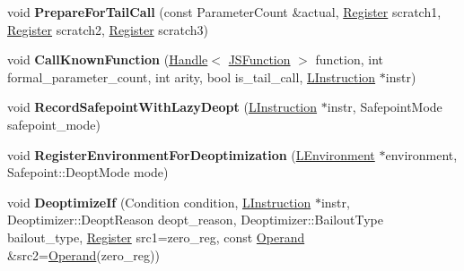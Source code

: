\begin{DoxyCompactItemize}
\item 
void {\bfseries Prepare\+For\+Tail\+Call} (const Parameter\+Count \&actual, \hyperlink{structv8_1_1internal_1_1_register}{Register} scratch1, \hyperlink{structv8_1_1internal_1_1_register}{Register} scratch2, \hyperlink{structv8_1_1internal_1_1_register}{Register} scratch3)\hypertarget{classv8_1_1internal_1_1_l_code_gen_ac244b5f30d2995d51f6d263358a7ccd9}{}\label{classv8_1_1internal_1_1_l_code_gen_ac244b5f30d2995d51f6d263358a7ccd9}

\item 
void {\bfseries Call\+Known\+Function} (\hyperlink{classv8_1_1internal_1_1_handle}{Handle}$<$ \hyperlink{classv8_1_1internal_1_1_j_s_function}{J\+S\+Function} $>$ function, int formal\+\_\+parameter\+\_\+count, int arity, bool is\+\_\+tail\+\_\+call, \hyperlink{classv8_1_1internal_1_1_l_instruction}{L\+Instruction} $\ast$instr)\hypertarget{classv8_1_1internal_1_1_l_code_gen_adec87ca608c3363d2fa40b37952378b9}{}\label{classv8_1_1internal_1_1_l_code_gen_adec87ca608c3363d2fa40b37952378b9}

\item 
void {\bfseries Record\+Safepoint\+With\+Lazy\+Deopt} (\hyperlink{classv8_1_1internal_1_1_l_instruction}{L\+Instruction} $\ast$instr, Safepoint\+Mode safepoint\+\_\+mode)\hypertarget{classv8_1_1internal_1_1_l_code_gen_ae96e1ea2617dfdd8a23b554d85bdd250}{}\label{classv8_1_1internal_1_1_l_code_gen_ae96e1ea2617dfdd8a23b554d85bdd250}

\item 
void {\bfseries Register\+Environment\+For\+Deoptimization} (\hyperlink{classv8_1_1internal_1_1_l_environment}{L\+Environment} $\ast$environment, Safepoint\+::\+Deopt\+Mode mode)\hypertarget{classv8_1_1internal_1_1_l_code_gen_a8e3566b9bf7194223c47e7dac6fd6a10}{}\label{classv8_1_1internal_1_1_l_code_gen_a8e3566b9bf7194223c47e7dac6fd6a10}

\item 
void {\bfseries Deoptimize\+If} (Condition condition, \hyperlink{classv8_1_1internal_1_1_l_instruction}{L\+Instruction} $\ast$instr, Deoptimizer\+::\+Deopt\+Reason deopt\+\_\+reason, Deoptimizer\+::\+Bailout\+Type bailout\+\_\+type, \hyperlink{structv8_1_1internal_1_1_register}{Register} src1=zero\+\_\+reg, const \hyperlink{classv8_1_1internal_1_1_operand}{Operand} \&src2=\hyperlink{classv8_1_1internal_1_1_operand}{Operand}(zero\+\_\+reg))\hypertarget{classv8_1_1internal_1_1_l_code_gen_a9dab88efe856f5f85e8693d7f20341cf}{}\label{classv8_1_1internal_1_1_l_code_gen_a9dab88efe856f5f85e8693d7f20341cf}


\end{DoxyCompactItemize}

